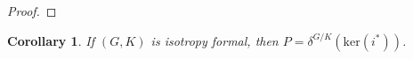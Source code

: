 \documentclass[11pt]{amsart}
\theoremstyle{plain}
\newtheorem{corollary}[theorem]{Corollary}
\theoremstyle{definition}
\begin{document}
\begin{proof}
\end{proof}
\begin{corollary}\label{pequaldel}
		If $(G, K)$ is isotropy formal, then $P=\delta^{G/K}(\text{ker}(i^*))$.
\end{corollary}
\end{document}
